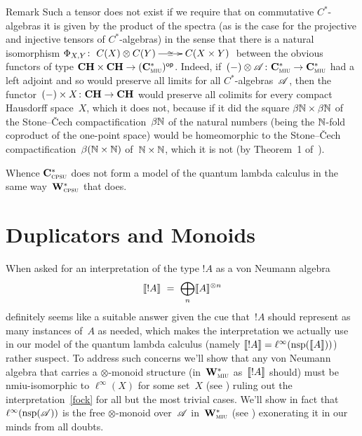 \documentclass[a]{subfiles}
\begin{document}
\begin{parsec}
\begin{point}{Remark}
Such a tensor does not exist
if we require that
on commutative
$C^*$-algebras it is given by the product of the spectra
(as is the case for the projective and injective tensors
of $C^*$-algebras)
in the sense that there
is a natural isomorphism
$\Phi_{X,Y}\colon 
\smash{\xymatrix{
C(X)\otimes C(Y)
\ar[r]|-{\cong}
&
C(X\times  Y)}}$ 
between the obvious functors of type $\mathbf{CH}\times \mathbf{CH}\to {(\mathbf{C}^*_{\text{\textsc{miu}}})}{^{\mathsf{op}}}$.
Indeed, if~$(-)\otimes \mathscr{A}\colon \mathbf{C}^*_{\text{\textsc{miu}}}\to\mathbf{C}^*_{\text{\textsc{miu}}}$
had a left adjoint 
and so would preserve all limits
for all $C^*$-algebras~$\mathscr{A}$,
then the functor~$(-)\times X\colon \mathbf{CH}\to\mathbf{CH}$
would preserve all colimits
for every compact Hausdorff space~$X$,
which it does not,
because if it did
the square $\beta\mathbb{N} \times \beta\mathbb{N}$ of
the Stone--\v{C}ech compactification~$\beta\mathbb{N}$
of the natural numbers (being the $\mathbb{N}$-fold
coproduct of the one-point space)
would be homeomorphic to the Stone--\v{C}ech
compactification~$\beta(\mathbb{N}\times \mathbb{N})$
of~$\mathbb{N}\times \mathbb{N}$,
which it is not (by Theorem~1 of~\cite{glicksberg1959}).

Whence
$\mathbf{C}^*_{\text{\textsc{cpsu}}}$
does not form a model of the quantum lambda calculus
in the same way~$\mathbf{W}^*_{\text{\textsc{cpsu}}}$ that does.
\end{point}
\end{parsec}

\section{Duplicators and Monoids}
\begin{parsec}%
\begin{point}%
When asked for an
interpretation of the type $!A$
as a von Neumann algebra
\begin{equation}
\label{fock}
\sem{!A}
\ = \ 
\bigoplus_n \sem{A}^{\otimes n}
\end{equation}
definitely seems
like a suitable answer
given
the cue that~$!A$ should represent
as many instances of~$A$ as needed,
which makes the interpretation
we actually use in our model of the quantum lambda calculus
(namely $\llbracket!A\rrbracket=\ell^\infty(\mathrm{nsp}(\llbracket A\rrbracket))$)
rather
suspect.
To address such concerns
we'll show that any von Neumann algebra
that carries a $\otimes$-monoid structure
(in~$\mathbf{W}^*_{\text{\textsc{miu}}}$ as~$\llbracket!A\rrbracket$ should)
must be nmiu-isomorphic
to $\ell^\infty(X)$ for some set~$X$
(see )
ruling out the interpretation~\eqref{fock}
for all but the most trivial cases.
We'll show in fact that~$\ell^\infty(\mathrm{nsp}(\mathscr{A}))$
is the free $\otimes$-monoid
over~$\mathscr{A}$
in~$\mathbf{W}^*_{\text{\textsc{miu}}}$ (see )
exonerating it in our minds from all doubts.
\end{point}
\end{parsec}
\end{document}
